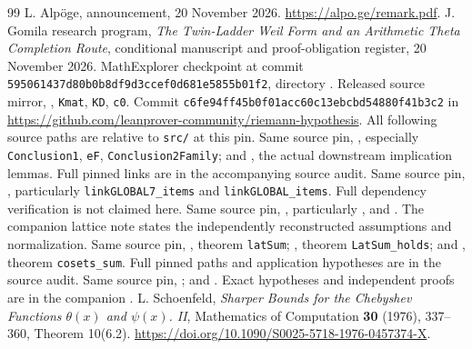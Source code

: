 \documentclass[11pt,letterpaper]{article}
\theoremstyle{definition}
\theoremstyle{remark}
\numberwithin{equation}{section}
\begin{document}
\begin{thebibliography}{99}\small
{} L. Alp\"oge, announcement, 20 November 2026. \url{https://alpo.ge/remark.pdf}.
 J. Gomila research program, \emph{The Twin-Ladder Weil Form and an Arithmetic Theta Completion Route}, conditional manuscript and proof-obligation register, 20 November 2026. MathExplorer checkpoint at commit \texttt{595061437d80b0b8df9d3ccef0d681e5855b01f2}, directory .
 Released source mirror, , \texttt{Kmat}, \texttt{KD}, \texttt{c0}. Commit \texttt{c6fe94ff45b0f01acc60c13ebcbd54880f41b3c2} in \url{https://github.com/leanprover-community/riemann-hypothesis}. All following source paths are relative to \texttt{src/} at this pin.
 Same source pin, , especially \texttt{Conclusion1}, \texttt{eF}, \texttt{Conclusion2Family}; and , the actual downstream implication lemmas. Full pinned links are in the accompanying source audit.
 Same source pin, , particularly \texttt{linkGLOBAL7\_items} and \texttt{linkGLOBAL\_items}. Full dependency verification is not claimed here.
 Same source pin, , particularly ,  and . The companion lattice note states the independently reconstructed assumptions and normalization.
 Same source pin, , theorem \texttt{latSum}; , theorem \texttt{LatSum\_holds}; and , theorem \texttt{cosets\_sum}. Full pinned paths and application hypotheses are in the source audit.
 Same source pin, ; and . Exact hypotheses and independent proofs are in the companion .
 L. Schoenfeld, \emph{Sharper Bounds for the Chebyshev Functions $\theta(x)$ and $\psi(x)$. II}, Mathematics of Computation \textbf{30} (1976), 337--360, Theorem 10(6.2). \url{https://doi.org/10.1090/S0025-5718-1976-0457374-X}.

\end{thebibliography}
\end{document}
